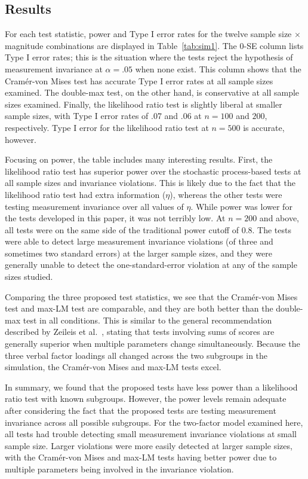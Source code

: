 \documentclass[man]{apa}
\begin{document}
\subsection{Results}
For each test statistic, power and Type I error rates for the twelve
sample size $\times$ magnitude combinations are displayed in
Table~\ref{tab:sim1}.  The 0-SE column lists Type I error rates; this
is the situation where the tests reject the hypothesis of measurement
invariance at $\alpha=.05$ when none exist.  This column 
shows that the Cram\'{e}r-von Mises test has accurate Type I error
rates at all sample sizes examined.
The double-max test, on the other hand, is conservative at
all sample sizes examined.  Finally, the likelihood ratio test is
slightly liberal at smaller sample sizes, with Type I error rates of
.07 and .06 at $n=100$ and $200$, respectively.  Type I error for the
likelihood ratio test at $n=500$ is accurate, however.

Focusing on power, the table includes many interesting results.
First, the likelihood ratio test has superior power over the stochastic
process-based tests at all sample sizes and invariance violations.
This is likely due to the fact that the likelihood ratio test had
extra information ($\eta$), whereas the other tests
were testing measurement invariance over all values
of $\eta$.  While power was lower for the tests developed in this
paper, it was not terribly low.  At $n=200$ and above, all tests were
on the same side of the traditional power cutoff of 0.8.  The tests
were able to detect large measurement invariance violations (of three
and sometimes two standard errors) at the larger sample sizes, and
they were generally unable to detect the one-standard-error violation
at any of the sample sizes studied.

Comparing the three proposed test statistics, we see that the
Cram\'{e}r-von Mises test and max-LM test are comparable, and they are
both better than the double-max test in all conditions.  This is
similar to the general recommendation described by Zeileis et al.\
\citeyear{ZeiSha10}, stating that tests involving sums of scores
are generally superior when multiple parameters change simultaneously.
Because the three verbal factor loadings all changed
across the two subgroups in the simulation, the Cram\'{e}r-von Mises
and max-LM tests excel.

In summary, we found that the proposed tests have less power than a
likelihood ratio test with known subgroups.  However, the power levels
remain adequate after considering the fact that the proposed tests are
testing measurement invariance across all possible subgroups.  For the
two-factor model examined here, all tests had trouble detecting small
measurement invariance violations at small sample size.  Larger
violations were more easily detected at larger sample sizes, with the
Cram\'{e}r-von Mises and max-LM tests having better power due to multiple
parameters being involved in the invariance violation.
\end{document}
